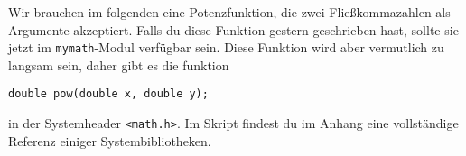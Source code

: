 \documentclass{uebungszettel}
\begin{document}


Wir brauchen im folgenden eine Potenzfunktion, die zwei Fließkommazahlen als Argumente akzeptiert. Falls du diese Funktion gestern geschrieben hast, sollte sie jetzt im \verb|mymath|-Modul verfügbar sein. Diese Funktion wird aber vermutlich zu langsam sein, daher gibt es die funktion 

\begin{verbatim}
double pow(double x, double y);
\end{verbatim}

in der Systemheader \verb|<math.h>|. Im Skript findest du im Anhang eine vollständige Referenz einiger Systembibliotheken.




\end{document}
